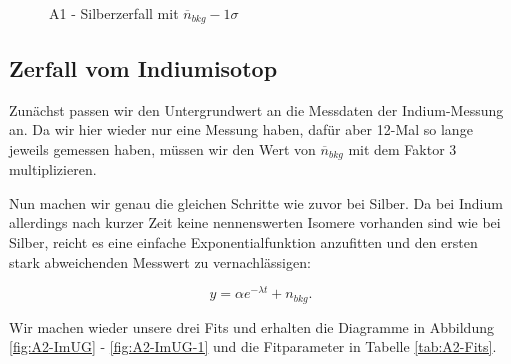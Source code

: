 \documentclass{article}
\begin{document}
\begin{figure}[!h]
    \centering
    \caption{A1 - Silberzerfall mit $\overline{n}_{bkg} - 1\sigma$}
    \label{fig:A1-SmUG-1}
\end{figure}


\clearpage
\newpage

\subsection{Zerfall vom Indiumisotop}

Zunächst passen wir den Untergrundwert an die Messdaten der Indium-Messung an. Da wir hier wieder nur eine Messung haben, dafür aber 12-Mal so lange jeweils gemessen haben, müssen wir den Wert von $\overline{n}_{bkg}$ mit dem Faktor 3 multiplizieren.

Nun machen wir genau die gleichen Schritte wie zuvor bei Silber. Da bei Indium allerdings nach kurzer Zeit keine nennenswerten Isomere vorhanden sind wie bei Silber, reicht es eine einfache Exponentialfunktion anzufitten und den ersten stark abweichenden Messwert zu vernachlässigen:

\begin{equation}
    y = \alpha e^{-\lambda t} + n_{bkg}.
\end{equation}

Wir machen wieder unsere drei Fits und erhalten die Diagramme in Abbildung \ref{fig:A2-ImUG} - \ref{fig:A2-ImUG-1} und die Fitparameter in Tabelle \ref{tab:A2-Fits}.

\phantom{.}
\end{document}
